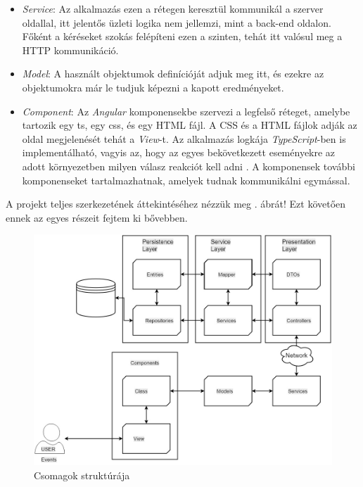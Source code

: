 \begin{itemize}
    \item \textit{Service}: Az alkalmazás ezen a rétegen keresztül kommunikál a szerver oldallal, itt jelentős üzleti logika nem jellemzi, mint a back-end oldalon. Főként a kéréseket szokás felépíteni ezen a szinten, tehát itt valósul meg a HTTP kommunikáció.
    \item \textit{Model}: A használt objektumok definícióját adjuk meg itt, és ezekre az objektumokra már le tudjuk képezni a kapott eredményeket.
    \item \textit{Component}:  Az \textit{Angular} komponensekbe szervezi a legfelső réteget, amelybe tartozik egy ts, egy css, és egy HTML fájl. A CSS és a HTML fájlok adják az oldal megjelenését tehát a \textit{View}-t. Az alkalmazás logkája \textit{TypeScript}-ben is implementálható, vagyis az, hogy az egyes bekövetkezett eseményekre az adott környezetben milyen válasz reakciót kell adni \cite{10}. A komponensek további komponenseket tartalmazhatnak, amelyek tudnak kommunikálni egymással.
\end{itemize}


A projekt teljes szerkezetének áttekintéséhez nézzük meg . ábrát! Ezt követően ennek az egyes részeit fejtem ki bővebben.

\begin{figure}[h!]
\centering
\includegraphics[scale=0.4]{kepek/mvc_arch.jpg}
\caption{Csomagok struktúrája}
\label{fig:mvc}
\end{figure}


